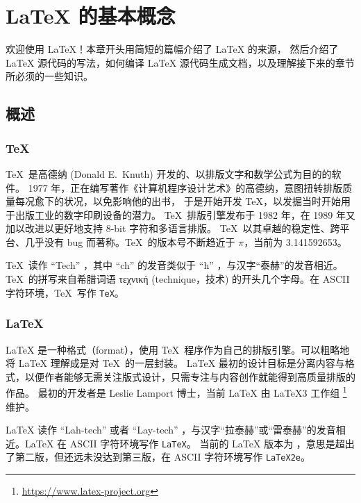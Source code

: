\chapter{\LaTeX{} 的基本概念}\label{chap:basics}

\begin{intro}
欢迎使用 \LaTeX{}！本章开头用简短的篇幅介绍了 \LaTeX{} 的来源，
然后介绍了 \LaTeX{} 源代码的写法，如何编译 \LaTeX{} 源代码生成文档，以及理解接下来的章节所必须的一些知识。
\end{intro}

\section{概述}\label{sec:intro}

\subsection{\protect\TeX}\label{subsec:tex}

\TeX\ 是高德纳 (Donald E.~Knuth) 开发的、以排版文字和数学公式为目的的软件\cite{texbook}。
1977 年，正在编写著作《计算机程序设计艺术》的高德纳，意图扭转排版质量每况愈下的状况，以免影响他的出书，
于是开始开发 \TeX{}，以发掘当时开始用于出版工业的数字印刷设备的潜力。
\TeX\ 排版引擎发布于 1982 年，在 1989 年又加以改进以更好地支持 8-bit 字符和多语言排版。
\TeX\ 以其卓越的稳定性、跨平台、几乎没有 bug 而著称。\TeX\ 的版本号不断趋近于 $\pi$，当前为 3.141592653。

\TeX\ 读作 ``Tech'' ，其中 ``ch'' 的发音类似于 ``h'' ，与汉字“泰赫”的发音相近。\TeX\ 的拼写来自希腊词语
τεχνική (technique，技术) 的开头几个字母。在 ASCII 字符环境，\TeX\ 写作 \texttt{TeX}。

\subsection{\LaTeX}\label{subsec:latex}

\LaTeX{} 是一种格式（format），使用 \TeX\ 程序作为自己的排版引擎。可以粗略地将 \LaTeX{} 理解成是对 \TeX\ 的一层封装。
\LaTeX{} 最初的设计目标是分离内容与格式，以便作者能够无需关注版式设计，只需专注与内容创作就能得到高质量排版的作品。
最初的开发者是 Leslie Lamport 博士\cite{manual}，当前 \LaTeX{} 由 \LaTeX 3 工作组%
\footnote{\url{https://www.latex-project.org}}维护。

\LaTeX{} 读作 ``Lah-tech'' 或者 ``Lay-tech'' ，与汉字“拉泰赫”或“雷泰赫”的发音相近。\LaTeX{} 在 ASCII 字符环境写作 \texttt{LaTeX}。
当前的 \LaTeX{} 版本为 \LaTeXe ，意思是超出了第二版，但还远未没达到第三版，在 ASCII 字符环境写作 \texttt{LaTeX2e}。

